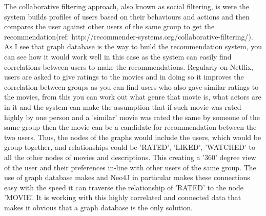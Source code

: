 \documentclass[a4paper]{article}
\begin{document}
The collaborative filtering approach, also known as social filtering, is were the system builds profiles of users based on their behaviours and actions and then compares the user against other users of the same group to get the recommendation(ref: http://recommender-systems.org/collaborative-filtering/). As I see that graph database is the way to build the recommendation system, you can see how it would work well in this case as the system can easily find correlations between users to make the recommendations. Regularly on Netflix, users are asked to give ratings to the movies and in doing so it improves the correlation between groups as you can find users who also gave similar ratings to the movies, from this you can work out what genre that movie is, what actors are in it and the system can make the assumption that if such movie was rated highly by one person and a 'similar' movie was rated the same by someone of the same group then the movie can be a candidate for recommendation between the two users. Thus, the nodes of the graphs would include the users, which would be group together, and relationships could be 'RATED', 'LIKED', 'WATCHED' to all the other nodes of movies and descriptions. This creating a '360' degree view of the user and their preferences in-line with other users of the same group. The use of graph database makes and Neo4J in particular makes these connections easy with the speed it can traverse the relationship of 'RATED' to the node 'MOVIE'. It is working with this highly correlated and connected data that makes it obvious that a graph database is the only solution.
\end{document}
